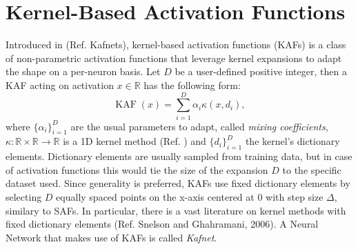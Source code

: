 \documentclass[LaM,binding=0.6cm]{./packages/sapthesis/sapthesis}
\begin{document}
    \section{Kernel-Based Activation Functions}
    Introduced in (Ref. Kafnets), kernel-based activation functions (KAFs) is a class of non-parametric activation functions that leverage kernel expansions to adapt the shape on a per-neuron basis.
    Let $D$ be a user-defined positive integer, then a KAF acting on activation $x \in \mathbb{R} $ has the following form:
    \begin{equation}
        \operatorname{KAF} (x) = \sum_{i=1}^{D} \alpha_{i} \kappa\left(x, d_{i}\right),
    \end{equation}
    where $\{ \alpha_i\}_{i=1}^D $ are the usual parameters to adapt, called \textit{mixing coefficients}, $\kappa \colon \mathbb{R} \times \mathbb{R} \to \mathbb{R}$ is a 1D kernel method (Ref. )   
    and $\{ d_i\}_{i=1}^D $ the kernel's dictionary elements. Dictionary elements are usually sampled from training data, but in case of activation functions 
    this would tie the size of the expansion $D$ to the specific dataset used. Since generality is preferred, KAFs use fixed dictionary elements by selecting
    $D$ equally spaced points on the x-axis centered at 0 with step size $\Delta$, similary to SAFs. In particular, there is a vast literature on kernel methods with fixed dictionary elements (Ref. Snelson and Ghahramani, 2006).
    A Neural Network that makes use of KAFs is called \textit{Kafnet}.
\end{document}
